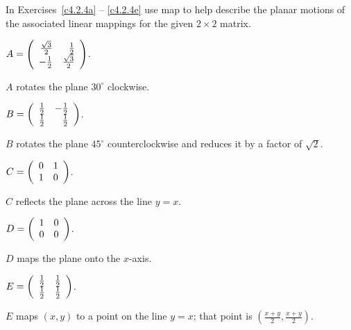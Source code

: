 \documentclass{ximera}
\begin{document}
\noindent In Exercises~\ref{c4.2.4a} -- \ref{c4.2.4e} use {\sf map} to
help describe the planar motions of the associated linear mappings for the
given $2\times 2$ matrix.
\begin{computerExercise} \label{c4.2.4a}
$A=\left(\begin{array}{rr} \frac{\sqrt{3}}{2} & \frac{1}{2}\\ -\frac{1}{2} &\frac{\sqrt{3}}{2}\end{array}\right)$.

\begin{solution}
$A$ rotates the plane $30^\circ$ clockwise.

\end{solution}
\end{computerExercise}
\begin{computerExercise} \label{c4.2.4b}
$B = \left(\begin{array}{rr} \frac{1}{2} & -\frac{1}{2}\\ \frac{1}{2} &\frac{1}{2}\end{array}\right)$.

\begin{solution}
$B$ rotates the plane $45^\circ$ counterclockwise and
reduces it by a factor of $\sqrt{2}$.

\end{solution}
\end{computerExercise}
\begin{computerExercise} \label{c4.2.4c}
$C = \left(\begin{array}{rr} 0 & 1\\ 1 &0\end{array}\right)$.

\begin{solution}
$C$ reflects the plane across the line $y = x$.

\end{solution}
\end{computerExercise}
\begin{computerExercise} \label{c4.2.4d}
$D = \left(\begin{array}{rr} 1 & 0\\ 0 &0\end{array}\right)$.

\begin{solution}
$D$ maps the plane onto the $x$-axis.

\end{solution}
\end{computerExercise}
\begin{computerExercise} \label{c4.2.4e}
$E = \left(\begin{array}{rr} \frac{1}{2} & \frac{1}{2}\\ \frac{1}{2} &\frac{1}{2}\end{array}\right)$.

\begin{solution}
$E$ maps $(x,y)$ to a point on the line $y = x$; that
point is $(\frac{x + y}{2}, \frac{x + y}{2})$.


\end{solution}
\end{computerExercise}
\end{document}
